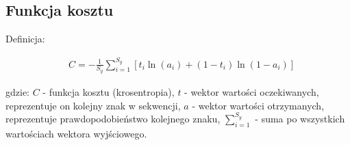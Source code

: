 \subsection{Funkcja kosztu}

Definicja:

\begin{align*}
  &C = - \frac{1}{S_y}\sum_{i=1}^{S_y}[t_i\ln(a_i) + (1-t_i)\ln(1-a_i)]
\end{align*}

gdzie: \newline
$C$ - funkcja kosztu (krosentropia), \newline
$t$ - wektor wartości oczekiwanych, reprezentuje on kolejny znak w sekwencji, \newline
$a$ - wektor wartości otrzymanych, reprezentuje prawdopodobieństwo kolejnego znaku,  \newline
$\sum_{i=1}^{S_y}$ - suma po wszystkich wartościach wektora wyjściowego. \newline